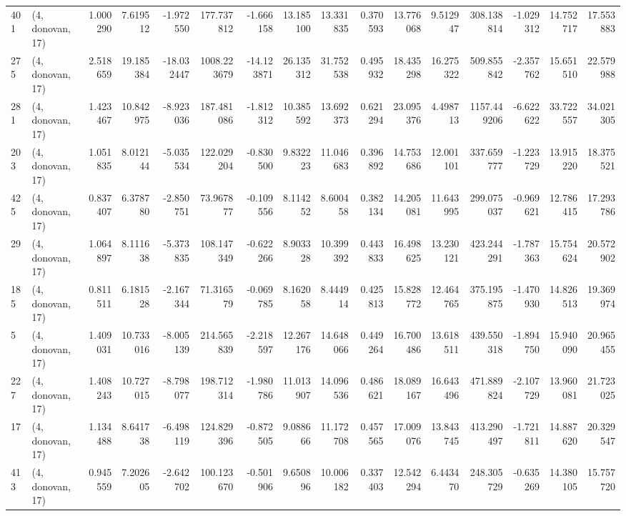 \begin{tabular}{llrrrrrrrrrrrrrr}
401 &  (4, donovan, 17) &   1.000290 &   7.619512 &  -1.972550 &   177.737812 &  -1.666158 &  13.185100 &  13.331835 &  0.370593 &  13.776068 &   9.512947 &   308.138814 & -1.029312 &  14.752717 &  17.553883 \\
275 &  (4, donovan, 17) &   2.518659 &  19.185384 & -18.032447 &  1008.223679 & -14.123871 &  26.135312 &  31.752538 &  0.495932 &  18.435298 &  16.275322 &   509.855842 & -2.357762 &  15.651510 &  22.579988 \\
281 &  (4, donovan, 17) &   1.423467 &  10.842975 &  -8.923036 &   187.481086 &  -1.812312 &  10.385592 &  13.692373 &  0.621294 &  23.095376 &   4.498713 &  1157.449206 & -6.622622 &  33.722557 &  34.021305 \\
203 &  (4, donovan, 17) &   1.051835 &   8.012144 &  -5.035534 &   122.029204 &  -0.830500 &   9.832223 &  11.046683 &  0.396892 &  14.753686 &  12.001101 &   337.659777 & -1.223729 &  13.915220 &  18.375521 \\
425 &  (4, donovan, 17) &   0.837407 &   6.378780 &  -2.850751 &    73.967877 &  -0.109556 &   8.114252 &   8.600458 &  0.382134 &  14.205081 &  11.643995 &   299.075037 & -0.969621 &  12.786415 &  17.293786 \\
29  &  (4, donovan, 17) &   1.064897 &   8.111638 &  -5.373835 &   108.147349 &  -0.622266 &   8.903328 &  10.399392 &  0.443833 &  16.498625 &  13.230121 &   423.244291 & -1.787363 &  15.754624 &  20.572902 \\
185 &  (4, donovan, 17) &   0.811511 &   6.181528 &  -2.167344 &    71.316579 &  -0.069785 &   8.162058 &   8.444914 &  0.425813 &  15.828772 &  12.464765 &   375.195875 & -1.470930 &  14.826513 &  19.369974 \\
5   &  (4, donovan, 17) &   1.409031 &  10.733016 &  -8.005139 &   214.565839 &  -2.218597 &  12.267176 &  14.648066 &  0.449264 &  16.700486 &  13.618511 &   439.550318 & -1.894750 &  15.940090 &  20.965455 \\
227 &  (4, donovan, 17) &   1.408243 &  10.727015 &  -8.798077 &   198.712314 &  -1.980786 &  11.013907 &  14.096536 &  0.486621 &  18.089167 &  16.643496 &   471.889824 & -2.107729 &  13.960081 &  21.723025 \\
17  &  (4, donovan, 17) &   1.134488 &   8.641738 &  -6.498119 &   124.829396 &  -0.872505 &   9.088666 &  11.172708 &  0.457565 &  17.009076 &  13.843745 &   413.290497 & -1.721811 &  14.887620 &  20.329547 \\
413 &  (4, donovan, 17) &   0.945559 &   7.202605 &  -2.642702 &   100.123670 &  -0.501906 &   9.650896 &  10.006182 &  0.337403 &  12.542294 &   6.443470 &   248.305729 & -0.635269 &  14.380105 &  15.757720 \\

\end{tabular}
